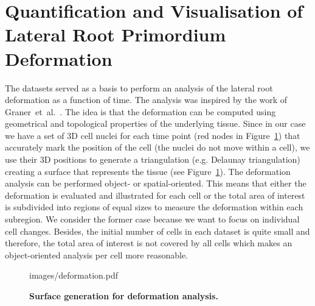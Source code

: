 \documentclass[11pt,a4paper, final]{article}
\begin{document}
\section{Quantification and Visualisation of Lateral Root Primordium Deformation}
\noindent
The datasets served as a basis to perform an analysis of the lateral root deformation as a function of time. The analysis was inspired by the work of Graner~et~al.~\cite{graner_et_al_2008}. The idea is that the deformation can be computed using geometrical and topological properties of the underlying tissue. Since in our case we have a set of 3D cell nuclei for each time point (red nodes in Figure~\ref{fig:deformation}) that accurately mark the position of the cell (the nuclei do not move within a cell), we use their 3D positions to generate a triangulation (e.g. Delaunay triangulation) creating a surface that represents the tissue (see Figure~\ref{fig:deformation}). The deformation analysis can be performed object- or spatial-oriented. This means that either the deformation is evaluated and illustrated for each cell or the total area of interest is subdivided into regions of equal sizes to measure the deformation within each subregion. We consider the former case because we want to focus on individual cell changes. Besides, the initial number of cells in each dataset is quite small and therefore, the total area of interest is not covered by all cells which makes an object-oriented analysis per cell more reasonable.
%
\begin{figure}[htbp]
	\begin{center}
		\begin{overpic}[width=1.\linewidth]{images/deformation.pdf}
		\end{overpic}
\caption[]
{
{\bf Surface generation for deformation analysis.}
}
	\label{fig:deformation}
	\end{center}
\end{figure}
%
\end{document}
